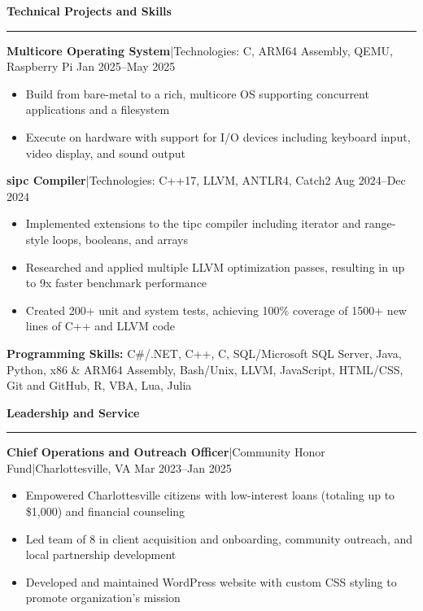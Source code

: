\documentclass[11pt,letterpaper]{article}
\newcommand{\horibar}[2]{#1\hspace{5pt}|\hspace{5pt}#2}
\newcommand{\sep}[1]{\par\vspace{#1}}
\renewenvironment{section}[1]{
\sep{11pt}
{
\fontsize{14}{2}
\selectfont
\textbf{#1}\\[0.5pt]
}
\sep{4pt}
\noindent\rule{\linewidth}{0.5pt}
\sep{4pt}
}
{
}
\renewenvironment{subsection}[3]
{
\sep{4pt}
\horibar{\textbf{#1}}{#2} \hfill #3
\par\setstretch{1}
\begin{itemize}
}
{
\end{itemize}
\setstretch{0}
}
\begin{document}
\begin{section}{Technical Projects and Skills}
    \begin{subsection}{Multicore Operating System}{Technologies: C, ARM64 Assembly, QEMU, Raspberry Pi}{Jan 2025–May 2025}
        \item Build from bare-metal to a rich, multicore OS supporting concurrent applications and a filesystem
        \item Execute on hardware with support for I/O devices including keyboard input, video display, and sound output
    \end{subsection}
    \begin{subsection}{sipc Compiler}{Technologies: C++17, LLVM, ANTLR4, Catch2}{Aug 2024–Dec 2024}
        \item Implemented extensions to the tipc compiler including iterator and range-style loops, booleans, and arrays
        \item Researched and applied multiple LLVM optimization passes, resulting in up to 9x faster benchmark performance 
        \item Created 200+ unit and system tests, achieving 100\% coverage of 1500+ new lines of C++ and LLVM code
    \end{subsection}
    {
    \sep{2pt}
    \textbf{Programming Skills:} C\#/.NET, C++, C, SQL/Microsoft SQL Server, Java, Python, x86 \& ARM64 Assembly, Bash/Unix, LLVM, JavaScript, HTML/CSS, Git and GitHub, R, VBA, Lua, Julia
    \par{}
    \sep{2pt}
    }
\end{section}

\begin{section}{Leadership and Service}
    \begin{subsection}{Chief Operations and Outreach Officer}{\horibar{Community Honor Fund}{Charlottesville, VA}}{Mar 2023–Jan 2025}
        \item Empowered Charlottesville citizens with low-interest loans (totaling up to \$1,000) and financial counseling
        \item Led team of 8 in client acquisition and onboarding, community outreach, and local partnership development
        \item Developed and maintained WordPress website with custom CSS styling to promote organization’s mission
    \end{subsection}
\end{section}
\end{document}
